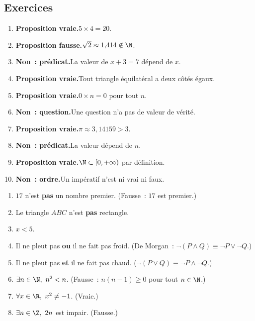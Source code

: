 

\subsection*{Exercices}


\begin{enumerate}
  \item \textbf{Proposition vraie.}\enspace $5\times4=20$.
  \item \textbf{Proposition fausse.}\enspace $\sqrt{2}\approx1{,}414\notin\N$.
  \item \textbf{Non~: pr\'edicat.}\enspace La valeur de $x+3=7$ d\'epend de $x$.
  \item \textbf{Proposition vraie.}\enspace Tout triangle \'equilat\'eral a deux c\^ot\'es \'egaux.
  \item \textbf{Proposition vraie.}\enspace $0\times n=0$ pour tout $n$.
  \item \textbf{Non~: question.}\enspace Une question n'a pas de valeur de v\'erit\'e.
  \item \textbf{Proposition vraie.}\enspace $\pi\approx3{,}14159>3$.
  \item \textbf{Non~: pr\'edicat.}\enspace La valeur d\'epend de $n$.
  \item \textbf{Proposition vraie.}\enspace $\N\subset[0,+\infty)$ par d\'efinition.
  \item \textbf{Non~: ordre.}\enspace Un imp\'eratif n'est ni vrai ni faux.
\end{enumerate}


\begin{enumerate}
  \item $17$ n'est \textbf{pas} un nombre premier. (Fausse~: $17$ est premier.)
  \item Le triangle $ABC$ n'est \textbf{pas} rectangle.
  \item $x < 5$.
  \item Il ne pleut pas \textbf{ou} il ne fait pas froid.
        (De Morgan~: $\lnot(P\land Q)\equiv\lnot P\lor\lnot Q$.)
  \item Il ne pleut pas \textbf{et} il ne fait pas chaud.
        ($\lnot(P\lor Q)\equiv\lnot P\land\lnot Q$.)
  \item $\exists n\in\N,\ n^2<n$. (Fausse~: $n(n-1)\geq0$ pour tout $n\in\N$.)
  \item $\forall x\in\R,\ x^2\ne-1$. (Vraie.)
  \item $\exists n\in\Z,\ 2n$ est impair. (Fausse.)
\end{enumerate}

